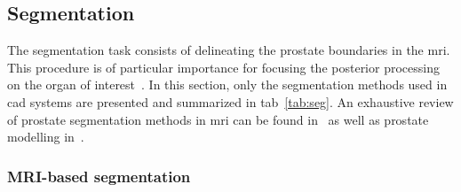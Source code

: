 \subsection{Segmentation} \label{subsec:segmentation}

The segmentation task consists of delineating the prostate boundaries in the \ac{mri}. This procedure is of particular importance for focusing the posterior processing on the organ of interest~\cite{Ghose2012}. In this section, only the segmentation methods used in \ac{cad} systems are presented and summarized in \ac{tab}~\ref{tab:seg}. An exhaustive review of prostate segmentation methods in \ac{mri} can be found in~\cite{Ghose2012} as well as prostate modelling in~\cite{Chilali2014}.

\subsubsection{MRI-based segmentation}

